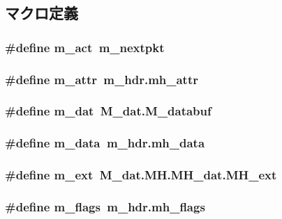 \subsection{マクロ定義}
\hypertarget{mbuf_8hh_a52a8aa0f017072e61f2239e164dba2f6}{
\subsubsection[{m\_\-act}]{\setlength{\rightskip}{0pt plus 5cm}\#define m\_\-act~m\_\-nextpkt}}
\label{mbuf_8hh_a52a8aa0f017072e61f2239e164dba2f6}
\hypertarget{mbuf_8hh_acd1b346488dae3e5c08d3de76513b798}{
\subsubsection[{m\_\-attr}]{\setlength{\rightskip}{0pt plus 5cm}\#define m\_\-attr~m\_\-hdr.mh\_\-attr}}
\label{mbuf_8hh_acd1b346488dae3e5c08d3de76513b798}
\hypertarget{mbuf_8hh_a2f5543cd861f88009b1ad07538953667}{
\subsubsection[{m\_\-dat}]{\setlength{\rightskip}{0pt plus 5cm}\#define m\_\-dat~M\_\-dat.M\_\-databuf}}
\label{mbuf_8hh_a2f5543cd861f88009b1ad07538953667}
\hypertarget{mbuf_8hh_a96f3766a8c0c04b88e62da8cf59c09a8}{
\subsubsection[{m\_\-data}]{\setlength{\rightskip}{0pt plus 5cm}\#define m\_\-data~m\_\-hdr.mh\_\-data}}
\label{mbuf_8hh_a96f3766a8c0c04b88e62da8cf59c09a8}
\hypertarget{mbuf_8hh_a081c07d4d893e57feab4f91ae02337e1}{
\subsubsection[{m\_\-ext}]{\setlength{\rightskip}{0pt plus 5cm}\#define m\_\-ext~M\_\-dat.MH.MH\_\-dat.MH\_\-ext}}
\label{mbuf_8hh_a081c07d4d893e57feab4f91ae02337e1}
\hypertarget{mbuf_8hh_abae9862c92061cacb9113955f2dd4f2d}{
\subsubsection[{m\_\-flags}]{\setlength{\rightskip}{0pt plus 5cm}\#define m\_\-flags~m\_\-hdr.mh\_\-flags}}
